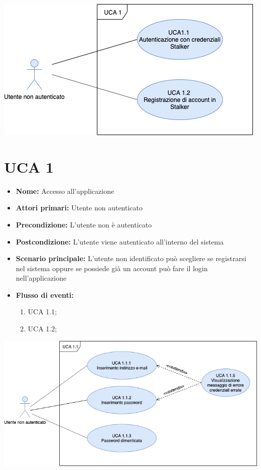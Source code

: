 

\centering\includegraphics[scale=0.8]{sezioni/UseCase/Immagini/Panoramica.png}
\section{UCA  1}%
\begin{itemize}
\item \textbf{Nome:} Accesso all'applicazione
\item \textbf{Attori primari:} Utente non autenticato
\item \textbf{Precondizione:} L’utente non è autenticato
\item \textbf{Postcondizione:} L’utente viene autenticato all’interno del sistema 
\item \textbf{Scenario principale:} L'utente non identificato può scegliere se registrarsi nel sistema oppure se possiede già un account può fare il login nell'applicazione %
\item \textbf{Flusso di eventi:}
    \begin{enumerate}
        \item UCA 1.1;
        \item UCA 1.2;
    \end{enumerate}

\end{itemize}

\newpage
\centering\includegraphics[scale=0.4]{sezioni/UseCase/Immagini/Login.png}
